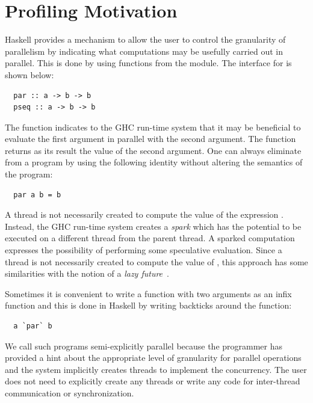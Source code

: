 \section{Profiling Motivation}
Haskell provides a mechanism to allow the user to control the granularity of parallelism by indicating what computations may be usefully carried out in parallel. This is done by using functions from the  module. The interface for  is shown below:
\begin{lstlisting}
  par :: a -> b -> b 
  pseq :: a -> b -> b 
\end{lstlisting}
The function  indicates to the GHC run-time system that it may be beneficial to evaluate the first argument in parallel with the second argument. The  function returns as its result the value of the second argument. One can always eliminate  from a program by using the following identity without altering the semantics of the program:
\begin{lstlisting}
  par a b = b 
\end{lstlisting}
A thread is not necessarily created to compute the value of the expression . Instead, the GHC run-time system creates a {\em spark} which has the potential to be executed on a different thread from the parent thread. A sparked computation expresses the possibility of performing some speculative evaluation. Since a thread is not necessarily created to compute the value of , this approach has some similarities with the notion of a {\em lazy future}~\cite{mohr:91}.

Sometimes it is convenient to write a function with two arguments as an
infix function and this is done in Haskell by writing backticks 
around the function:
\begin{lstlisting}
  a `par` b
\end{lstlisting}

We call such programs semi-explicitly parallel because the programmer has provided a hint about the appropriate level of granularity for parallel operations and the system implicitly creates threads to implement the concurrency. The user does not need to explicitly create any threads or write any code for inter-thread communication or synchronization.

